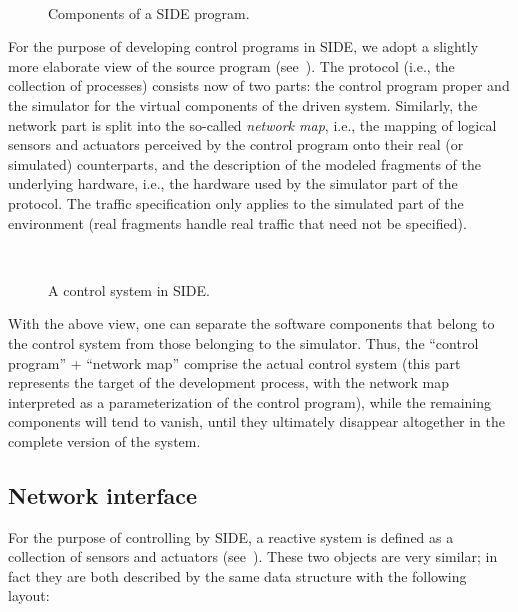 \begin{figure}[htbp]%
\begin{center}
\ 
\vspace{0.75cm}
\caption{Components of a SIDE program.\label{fig.struct2}}
\end{center}
\end{figure}%

For the purpose of developing control programs in SIDE, we adopt a slightly
more elaborate view of the source program (see~).
The protocol (i.e., the collection of processes) consists now of two parts:
the control program proper and the simulator for the virtual components of
the driven system.
Similarly, the network part is split into the so-called {\em network map},
i.e., the mapping of logical sensors and actuators perceived by the
control program onto their real (or simulated) counterparts,
and the description of the modeled fragments of the underlying hardware, i.e.,
the hardware used by the simulator part of the protocol.
The traffic specification only applies to the simulated part of the environment
(real fragments handle real traffic that need not be specified).

\begin{figure}[htbp]%
\begin{center}
\ 
\vspace{0.75cm}
\caption{A control system in SIDE.\label{fig.struct3}}
\end{center}
\end{figure}%

With the above view, one can separate the software components that
belong to the control system from those belonging to the simulator.
Thus, the ``control program'' + ``network map'' comprise the actual
control system (this part represents the target of the development
process, with the network map interpreted as a parameterization of the
control program), while the remaining components will tend to vanish,
until they ultimately disappear altogether in the complete version of
the system.

\subsection{Network interface}

For the purpose of controlling by SIDE, a reactive system is defined as
a collection of sensors and actuators (see~).
These two objects are very similar; in fact they are both described by the
same data structure with the following layout:

